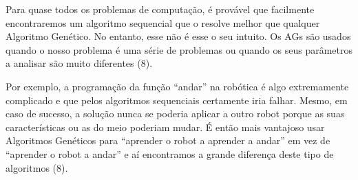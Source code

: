 Para quase todos os problemas de computação, é provável que facilmente encontraremos um algoritmo sequencial que o resolve melhor que qualquer Algoritmo Genético. No entanto, esse não é esse o seu intuito. Os AGs são usados quando o nosso problema é uma série de problemas ou quando os seus parâmetros a analisar são muito diferentes (8).

Por exemplo, a programação da função “andar” na robótica é algo extremamente complicado e que pelos algoritmos sequenciais certamente iria falhar. Mesmo, em caso de sucesso, a solução nunca se poderia aplicar a outro robot porque as suas características ou as do meio poderiam mudar. É então mais vantajoso usar Algoritmos Genéticos para “aprender o robot a aprender a andar” em vez de “aprender o robot a andar” e aí encontramos a grande diferença deste tipo de algoritmos (8).